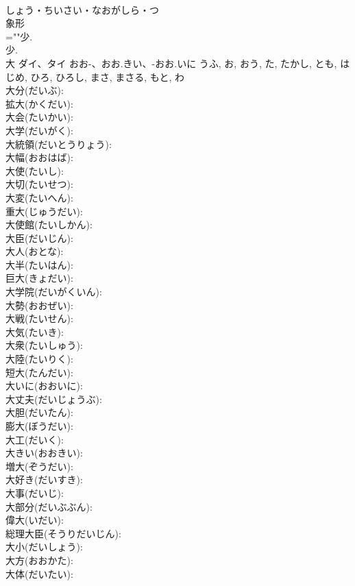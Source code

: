 \documentclass[8pt]{extreport}
\begin{document}
\begin{CJK}{UTF8}{min}
\\	しょう・ちいさい・なおがしら・つ	
\\	象形 
\\	=""少.
\\	少.
\\	大	ダイ、タイ	おお-、おお.きい、-おお.いに	うふ, お, おう, た, たかし, とも, はじめ, ひろ, ひろし, まさ, まさる, もと, わ	
\\	大分(だいぶ): 
\\	拡大(かくだい): 
\\	大会(たいかい): 
\\	大学(だいがく): 
\\	大統領(だいとうりょう): 
\\	大幅(おおはば): 
\\	大使(たいし): 
\\	大切(たいせつ): 
\\	大変(たいへん): 
\\	重大(じゅうだい): 
\\	大使館(たいしかん): 
\\	大臣(だいじん): 
\\	大人(おとな): 
\\	大半(たいはん): 
\\	巨大(きょだい): 
\\	大学院(だいがくいん): 
\\	大勢(おおぜい): 
\\	大戦(たいせん): 
\\	大気(たいき): 
\\	大衆(たいしゅう): 
\\	大陸(たいりく): 
\\	短大(たんだい): 
\\	大いに(おおいに): 
\\	大丈夫(だいじょうぶ): 
\\	大胆(だいたん): 
\\	膨大(ぼうだい): 
\\	大工(だいく): 
\\	大きい(おおきい): 
\\	増大(ぞうだい): 
\\	大好き(だいすき): 
\\	大事(だいじ): 
\\	大部分(だいぶぶん): 
\\	偉大(いだい): 
\\	総理大臣(そうりだいじん): 
\\	大小(だいしょう): 
\\	大方(おおかた): 
\\	大体(だいたい): 

\end{CJK}
\end{document}
